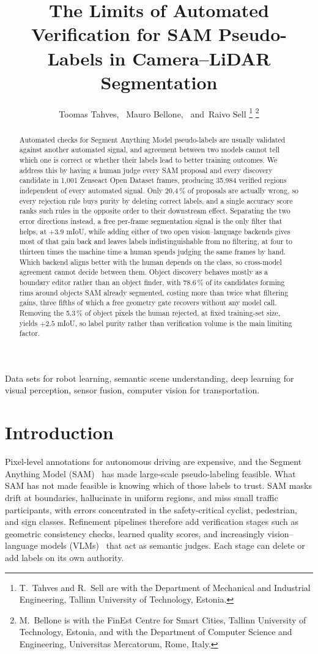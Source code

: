\documentclass[journal]{IEEEtran}
\title{The Limits of Automated Verification for SAM Pseudo-Labels in Camera–LiDAR Segmentation}
\author{Toomas Tahves,~\IEEEmembership{}
        Mauro Bellone,~\IEEEmembership{}
        and~Raivo Sell%
\thanks{T.~Tahves and R.~Sell are with the Department of Mechanical and Industrial
Engineering, Tallinn University of Technology, Estonia.}%
\thanks{M.~Bellone is with the FinEst Centre for Smart Cities, Tallinn University of
Technology, Estonia, and with the Department of Computer Science and Engineering,
Universitas Mercatorum, Rome, Italy.}}
\begin{document}
\maketitle

\begin{abstract}
Automated checks for Segment Anything Model pseudo-labels are usually validated against another automated signal, and agreement between two models cannot tell which one is correct or whether their labels lead to better training outcomes.
We address this by having a human judge every SAM proposal and every discovery candidate in 1{,}001 Zenseact Open Dataset frames, producing 35{,}984 verified regions independent of every automated signal.
Only 20.4\,\% of proposals are actually wrong, so every rejection rule buys purity by deleting correct labels, and a single accuracy score ranks such rules in the opposite order to their downstream effect.
Separating the two error directions instead, a free per-frame segmentation signal is the only filter that helps, at $+3.9$ mIoU, while adding either of two open vision--language backends gives most of that gain back and leaves labels indistinguishable from no filtering, at four to thirteen times the machine time a human spends judging the same frames by hand.
Which backend aligns better with the human depends on the class, so cross-model agreement cannot decide between them.
Object discovery behaves mostly as a boundary editor rather than an object finder, with 78.6\,\% of its candidates forming rims around objects SAM already segmented, costing more than twice what filtering gains, three fifths of which a free geometry gate recovers without any model call.
Removing the 5.3\,\% of object pixels the human rejected, at fixed training-set size, yields $+2.5$ mIoU, so label purity rather than verification volume is the main limiting factor.
\end{abstract}



\begin{IEEEkeywords}
Data sets for robot learning, semantic scene understanding, deep learning for visual perception, sensor fusion, computer vision for transportation.
\end{IEEEkeywords}

\section{Introduction}
Pixel-level annotations for autonomous driving are expensive, and the Segment Anything Model (SAM)~\cite{kirillov2023sam} has made large-scale pseudo-labeling feasible.
What SAM has not made feasible is knowing which of those labels to trust.
SAM masks drift at boundaries, hallucinate in uniform regions, and miss small traffic participants, with errors concentrated in the safety-critical cyclist, pedestrian, and sign classes.
Refinement pipelines therefore add verification stages such as geometric consistency checks, learned quality scores, and increasingly vision--language models (VLMs)~\cite{liu2024llava,wang2024qwen2vl} that act as semantic judges.
Each stage can delete or add labels on its own authority.
\end{document}

